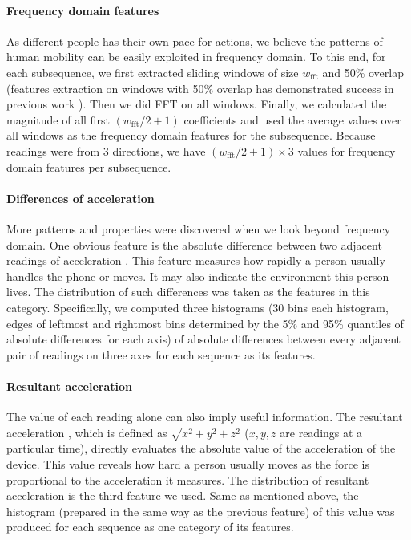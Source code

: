 \documentclass{article} %
\begin{document}
\paragraph{Frequency domain features}
As different people has their own pace for actions, we believe the patterns of human mobility can be easily exploited in frequency domain. To this end, for each subsequence, we first extracted sliding windows of size $w_\mathrm{fft}$ and 50\% overlap (features extraction on windows with 50\% overlap has demonstrated success in previous work \cite{Bao:PC2004}). Then we did FFT on all windows. Finally, we calculated the magnitude of all first $(w_\mathrm{fft}/2 + 1)$ coefficients and used the average values over all windows as the frequency domain features for the subsequence. Because readings were from 3 directions, we have $(w_\mathrm{fft}/2 + 1)\times 3$ values for frequency domain features per subsequence.

\paragraph{Differences of acceleration}
More patterns and properties were discovered when we look beyond frequency domain. One obvious feature is the absolute difference between two adjacent readings of acceleration \cite{Kwapisz:BTAS2009}. This feature measures how rapidly a person usually handles the phone or moves. It may also indicate the environment this person lives. The distribution of such differences was taken as the features in this category. Specifically, we computed three histograms (30 bins each histogram, edges of leftmost and rightmost bins determined by the 5\% and 95\% quantiles of absolute differences for each axis) of absolute differences between every adjacent pair of readings on three axes for each sequence as its features. 

\paragraph{Resultant acceleration}
The value of each reading alone can also imply useful information. The resultant acceleration \cite{Kwapisz:BTAS2009}, which is defined as $\sqrt{x^2+y^2+z^2}$ ($x,y,z$ are readings at a particular time), directly evaluates the absolute value of the acceleration of the device. This value reveals how hard a person usually moves as the force is proportional to the acceleration it measures. The distribution of resultant acceleration is the third feature we used. Same as mentioned above, the histogram (prepared in the same way as the previous feature) of this value was produced for each sequence as one category of its features.
\end{document}

